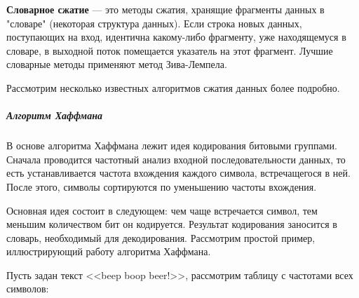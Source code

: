 \textbf{Словарное сжатие} --- это методы сжатия, хранящие фрагменты данных в
"словаре" (некоторая структура данных). Если строка новых данных, поступающих
на вход, идентична какому-либо фрагменту, уже находящемуся в словаре, в
выходной поток помещается указатель на этот фрагмент. Лучшие словарные методы
применяют метод Зива-Лемпела.

Рассмотрим несколько известных алгоритмов сжатия данных более подробно.

\subparagraph{Алгоритм Хаффмана}

В основе алгоритма Хаффмана лежит идея кодирования битовыми группами. Сначала
проводится частотный анализ входной последовательности данных, то есть
устанавливается частота вхождения каждого символа, встречащегося в ней. После
этого, символы сортируются по уменьшению частоты вхождения.

Основная идея состоит в следующем: чем чаще встречается символ, тем меньшим
количеством бит он кодируется. Результат кодирования заносится в словарь,
необходимый для декодирования. Рассмотрим простой пример, иллюстрирующий
работу алгоритма Хаффмана.

Пусть задан текст <<beep boop beer!>>, рассмотрим таблицу с частотами всех
символов:

